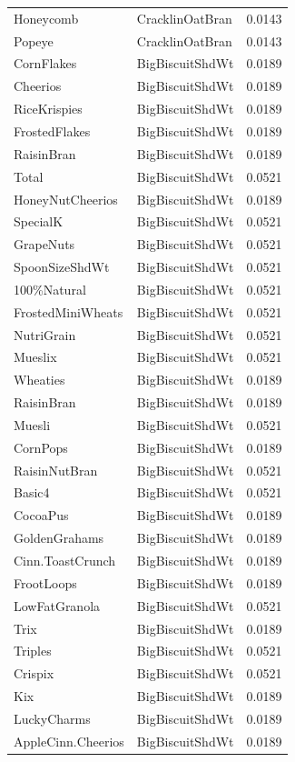 \begin{longtable}{llr}
Honeycomb & CracklinOatBran & 0.0143 \\
Popeye & CracklinOatBran & 0.0143 \\
CornFlakes & BigBiscuitShdWt & 0.0189 \\
Cheerios & BigBiscuitShdWt & 0.0189 \\
RiceKrispies & BigBiscuitShdWt & 0.0189 \\
FrostedFlakes & BigBiscuitShdWt & 0.0189 \\
RaisinBran & BigBiscuitShdWt & 0.0189 \\
Total & BigBiscuitShdWt & 0.0521 \\
HoneyNutCheerios & BigBiscuitShdWt & 0.0189 \\
SpecialK & BigBiscuitShdWt & 0.0521 \\
GrapeNuts & BigBiscuitShdWt & 0.0521 \\
SpoonSizeShdWt & BigBiscuitShdWt & 0.0521 \\
100\%Natural & BigBiscuitShdWt & 0.0521 \\
FrostedMiniWheats & BigBiscuitShdWt & 0.0521 \\
NutriGrain & BigBiscuitShdWt & 0.0521 \\
Mueslix & BigBiscuitShdWt & 0.0521 \\
Wheaties & BigBiscuitShdWt & 0.0189 \\
RaisinBran & BigBiscuitShdWt & 0.0189 \\
Muesli & BigBiscuitShdWt & 0.0521 \\
CornPops & BigBiscuitShdWt & 0.0189 \\
RaisinNutBran & BigBiscuitShdWt & 0.0521 \\
Basic4 & BigBiscuitShdWt & 0.0521 \\
CocoaPus & BigBiscuitShdWt & 0.0189 \\
GoldenGrahams & BigBiscuitShdWt & 0.0189 \\
Cinn.ToastCrunch & BigBiscuitShdWt & 0.0189 \\
FrootLoops & BigBiscuitShdWt & 0.0189 \\
LowFatGranola & BigBiscuitShdWt & 0.0521 \\
Trix & BigBiscuitShdWt & 0.0189 \\
Triples & BigBiscuitShdWt & 0.0521 \\
Crispix & BigBiscuitShdWt & 0.0521 \\
Kix & BigBiscuitShdWt & 0.0189 \\
LuckyCharms & BigBiscuitShdWt & 0.0189 \\
AppleCinn.Cheerios & BigBiscuitShdWt & 0.0189 \\

\end{longtable}
